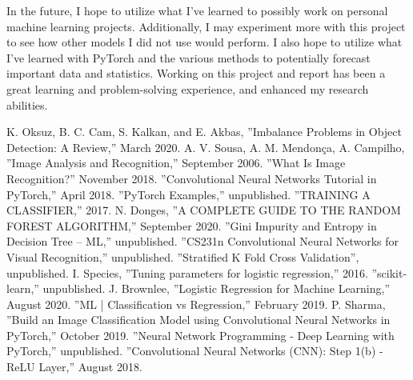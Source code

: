 \documentclass[conference]{IEEEtran}
\begin{document}
In the future, I hope to utilize what I've learned to possibly work on personal machine learning projects. Additionally, I may experiment more with this project to see how other models I did not use would perform. I also hope to utilize what I've learned with PyTorch and the various methods to potentially forecast important data and statistics. Working on this project and report has been a great learning and problem-solving experience, and enhanced my research abilities.  

\begin{thebibliography}{00}
 K. Oksuz, B. C. Cam, S. Kalkan, and E. Akbas, ''Imbalance Problems in Object Detection: A Review,'' March 2020.
 A. V. Sousa, A. M. Mendonça, A. Campilho, ''Image Analysis and Recognition,'' September 2006.
 ''What Is Image Recognition?'' November 2018.
 ''Convolutional Neural Networks Tutorial in PyTorch,'' April 2018.
 ''PyTorch Examples,'' unpublished.
 ''TRAINING A CLASSIFIER,'' 2017.
 N. Donges, ''A COMPLETE GUIDE TO THE RANDOM FOREST ALGORITHM,'' September 2020.
 ''Gini Impurity and Entropy in Decision Tree – ML,'' unpublished.
 ''CS231n Convolutional Neural Networks for Visual Recognition,'' unpublished.
 ''Stratified K Fold Cross Validation'', unpublished.
 I. Species, ''Tuning parameters for logistic regression,'' 2016.
 ''scikit-learn,'' unpublished.
 J. Brownlee, ''Logistic Regression for Machine Learning,'' August 2020.
 ''ML | Classification vs Regression,'' February 2019.
 P. Sharma, ''Build an Image Classification Model using Convolutional Neural Networks in PyTorch,'' October 2019.
 ''Neural Network Programming - Deep Learning with PyTorch,'' unpublished.
 ''Convolutional Neural Networks (CNN): Step 1(b) - ReLU Layer,'' August 2018.
\end{thebibliography}
\vspace{12pt}
\end{document}
